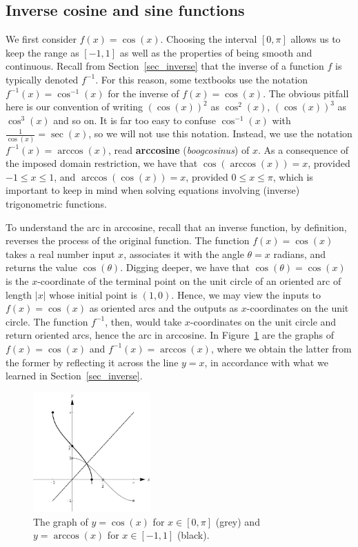 \subsection{Inverse cosine and sine functions}
We first consider $f(x) = \cos(x)$. Choosing the interval $[0,\pi]$ allows us to keep the range as $[-1,1]$ as well as the properties of being smooth and continuous. Recall from Section~\ref{sec_inverse} that the inverse of a function $f$ is typically denoted $f^{-1}$.  For this reason, some textbooks use the notation $f^{-1}(x) = \cos^{-1}(x)$ for the inverse of $f(x) = \cos(x)$.  The obvious pitfall here is our convention of writing $(\cos(x))^2$ as $\cos^{2}(x)$, $(\cos(x))^3$ as $\cos^{3}(x)$ and so on.  It is far too easy to confuse $\cos^{-1}(x)$ with  $\frac{1}{\cos(x)} = \sec(x)$, so we will not use this notation.  Instead, we use the notation $f^{-1}(x) = \arccos(x)$, read \textbf{arccosine} (\textit{boogcosinus}) of $x$.  As a consequence of the imposed domain restriction, we have that
 $\cos(\arccos(x)) = x$,  provided $-1 \leq x \leq 1$, and $\arccos(\cos(x)) = x$, provided $0 \leq x \leq \pi$, which is important to keep in mind when solving equations involving (inverse) trigonometric functions. 
 


To understand the arc in arccosine, recall that an inverse function, by definition, reverses the process of the original function. The function $f(x) = \cos(x)$ takes a real number input $x$, associates it with the angle $\theta = x$ radians, and returns the value $\cos(\theta)$.  Digging deeper, we have that $\cos(\theta) = \cos(x)$ is the $x$-coordinate of the terminal point on the unit circle of an oriented arc of length $|x|$ whose initial point is $(1, 0)$.  Hence, we may view the inputs to $f(x) = \cos(x)$ as oriented arcs and the outputs as $x$-coordinates on the unit circle.  The function $f^{-1}$, then, would take $x$-coordinates on the unit circle and return oriented arcs, hence the arc in arccosine. In Figure~\ref{fig_trans_33} are the graphs of $f(x) = \cos(x)$ and $f^{-1}(x) = \arccos(x)$, where we obtain the latter from the former by reflecting it across the line $y=x$, in accordance with what we learned in Section~\ref{sec_inverse}. 

\begin{figure}[H]
			\centering
\centerline{
\includegraphics[width=0.4\textwidth]{fig_trans_33}
}
	\caption{The graph of $y=\cos(x)$ for $x\in[0, \pi]$ (grey) and $y=\arccos(x)$ for $x\in[-1, 1]$ (black).}
\label{fig_trans_33}
\end{figure}


